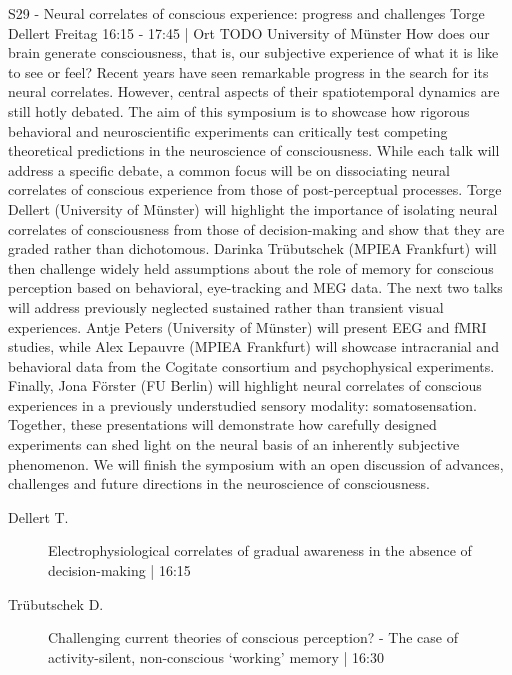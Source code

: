 
            \begin{symposium}
            {S29 - Neural correlates of conscious experience: progress and challenges}
            {Torge Dellert}
            {Freitag 16:15 - 17:45 | Ort TODO}
            {University of Münster}
            How does our brain generate consciousness, that is, our subjective experience of what it is like to see or feel? Recent years have seen remarkable progress in the search for its neural correlates. However, central aspects of their spatiotemporal dynamics are still hotly debated. The aim of this symposium is to showcase how rigorous behavioral and neuroscientific experiments can critically test competing theoretical predictions in the neuroscience of consciousness. While each talk will address a specific debate, a common focus will be on dissociating neural correlates of conscious experience from those of post-perceptual processes.
Torge Dellert (University of Münster) will highlight the importance of isolating neural correlates of consciousness from those of decision-making and show that they are graded rather than dichotomous. Darinka Trübutschek (MPIEA Frankfurt) will then challenge widely held assumptions about the role of memory for conscious perception based on behavioral, eye-tracking and MEG data. The next two talks will address previously neglected sustained rather than transient visual experiences. Antje Peters (University of Münster) will present EEG and fMRI studies, while Alex Lepauvre (MPIEA Frankfurt) will showcase intracranial and behavioral data from the Cogitate consortium and psychophysical experiments. Finally, Jona Förster (FU Berlin) will highlight neural correlates of conscious experiences in a previously understudied sensory modality: somatosensation.
Together, these presentations will demonstrate how carefully designed experiments can shed light on the neural basis of an inherently subjective phenomenon. We will finish the symposium with an open discussion of advances, challenges and future directions in the neuroscience of consciousness.
            \begin{description}    
            
                \item [ Dellert T.] Electrophysiological correlates of gradual awareness in the absence of decision-making \textcolor{mygray}{ | 16:15}    
                
                \item [ Trübutschek D.] Challenging current theories of conscious perception? - The case of activity-silent, non-conscious ‘working’ memory \textcolor{mygray}{ | 16:30}    
                

\end{description}
\end{symposium}
